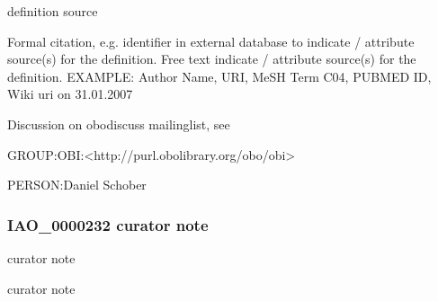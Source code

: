 \documentclass[letterpaper,10pt,english]{sphinxmanual}
\begin{document}
\begin{sphinxShadowBox}

\sphinxAtStartPar
definition source
\end{sphinxShadowBox}

\begin{sphinxShadowBox}

\sphinxAtStartPar
Formal citation, e.g. identifier in external database to indicate / attribute source(s) for the definition. Free text indicate / attribute source(s) for the definition. EXAMPLE: Author Name, URI, MeSH Term C04, PUBMED ID, Wiki uri on 31.01.2007
\end{sphinxShadowBox}

\begin{sphinxShadowBox}

\sphinxAtStartPar
Discussion on obo\sphinxhyphen{}discuss mailing\sphinxhyphen{}list, see 

\sphinxAtStartPar
GROUP:OBI:\textless{}http://purl.obolibrary.org/obo/obi\textgreater{}
\end{sphinxShadowBox}

\begin{sphinxShadowBox}

\sphinxAtStartPar
PERSON:Daniel Schober
\end{sphinxShadowBox}
\begin{quote}

\ignorespaces \end{quote}


\subsubsection{IAO\_0000232 \sphinxhyphen{} curator note}
\label{\detokenize{doc-IAO_0000232:iao-0000232-curator-note}}\label{\detokenize{doc-IAO_0000232:index-0}}\label{\detokenize{doc-IAO_0000232::doc}}
\begin{sphinxShadowBox}

\sphinxAtStartPar
curator note
\end{sphinxShadowBox}

\begin{sphinxShadowBox}

\sphinxAtStartPar
curator note
\end{sphinxShadowBox}
\end{document}
